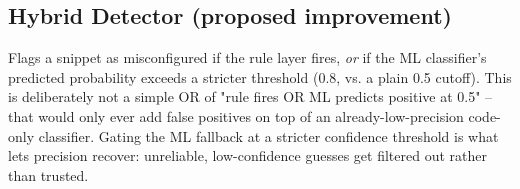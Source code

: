 \subsection{Hybrid Detector (proposed improvement)}
Flags a snippet as misconfigured if the rule layer fires, \emph{or} if the ML classifier's predicted probability exceeds a stricter threshold (0.8, vs. a plain 0.5 cutoff). This is deliberately not a simple OR of "rule fires OR ML predicts positive at 0.5" -- that would only ever add false positives on top of an already-low-precision code-only classifier. Gating the ML fallback at a stricter confidence threshold is what lets precision recover: unreliable, low-confidence guesses get filtered out rather than trusted.
